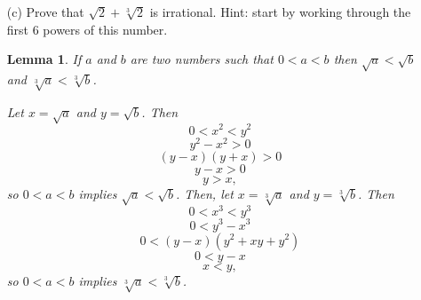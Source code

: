 \documentclass{article}
\newtheorem*{lemma}{Lemma}
\begin{document}
\begin{enumerate}
	\begin{proof}
		Let $x = \sqrt{6} - \sqrt{2} - \sqrt{3}$. Then 
		\begin{align*}
			x^2 &= \left(\sqrt{6} - \sqrt{2} - \sqrt{3}\right)^2 \\&= 6 - 2\sqrt{6}\left(\sqrt{2} + \sqrt{3}\right) + 2 + 2\sqrt{6} + 3 \\&= 11 + 2\sqrt{6}\left(1 - \left(\sqrt{2} + \sqrt{3}\right)\right).
		\end{align*} We then have
		\begin{align*}
			\left(x^2 - 11\right)^2 &=24\left(1 - 2\left(\sqrt{2} + \sqrt{3}\right)+ 2 + 2\sqrt{6} + 3\right) \\&= 24\left(6 + 2\left(\sqrt{6} - 
			\sqrt{2} - \sqrt{3}\right)\right) \\&= 24\left(6 + 2x\right),
		\end{align*} so
		\begin{align*}
			0 &= 24\left(6 + 2x\right) - \left(x^2 - 11\right)^2 \\&= -x^4 + 0x^3 + 22x^2 + 48x + 23,
		\end{align*} so based on (a), $x$ is either irrational, or an integer.
		Now we have
		\[2+3 < 1+6\]
		\[2+3+2\sqrt{6}<1+6+2\sqrt{6}\]
		\[\sqrt{2}+\sqrt{3}<1+\sqrt{6}\]
		\[\sqrt{2}+\sqrt{3}-\sqrt{6}<1\]
		\[\sqrt{6}-\sqrt{2}-\sqrt{3}>-1\]
		and
		\[1<6\]
		\[1<\sqrt{6}\]
		\[6<5+\sqrt{6}\]
		\[\sqrt{6}<\sqrt{2}+\sqrt{3}\]
		\[\sqrt{6}-\sqrt{2}-\sqrt{3}<0\]
		which leaves us with \[-1<x<0\] so $x$ is not an integer, and therefore it must be irrational.
	\end{proof}

	\item[(c)] Prove that $\sqrt{2} + \sqrt[3]{2}$ is irrational. Hint: start by working through the first 6 powers of this number.
	
	\begin{lemma}
		If $a$ and $b$ are two numbers such that $0 < a < b$ then $\sqrt{a} < \sqrt{b}$ and $\sqrt[3]{a} < \sqrt[3]{b}$.

		Let $x = \sqrt{a}$ and $y = \sqrt{b}$. Then \[0 < x^2 < y^2\]\[y^2 - x^2 > 0\]\[(y-x)(y+x) > 0\]\[y-x > 0\]\[y > x,\] so $0 < a < b$ implies $\sqrt{a}<\sqrt{b}$.
		Then, let $x = \sqrt[3]{a}$ and $y = \sqrt[3]{b}$. Then
		\[0 < x^3 < y^3\]
		\[0 < y^3 - x^3\]
		\[0 < (y - x)(y^2 + xy + y^2)\]
		\[0 < y - x\]
		\[x < y,\]
		so $0 < a < b$ implies $\sqrt[3]{a} < \sqrt[3]{b}$.
	\end{lemma}
	

\end{enumerate}
\end{document}
